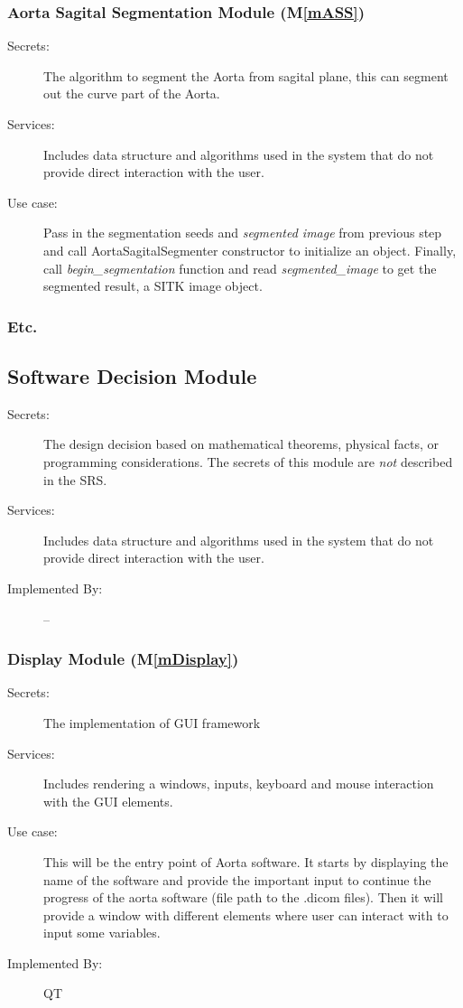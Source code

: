 \documentclass[12pt, titlepage]{article}
\newcommand{\mref}[1]{M\ref{#1}}
\begin{document}
\subsubsection{Aorta Sagital Segmentation Module (\mref{mASS})}
\begin{description}
\item[Secrets:] The algorithm to segment the Aorta from sagital plane, this can segment out the curve part of the Aorta.
\item[Services:] Includes data structure and algorithms used in the system that
  do not provide direct interaction with the user. 
\item[Use case:] Pass in the segmentation seeds and \emph{segmented image} from previous step and call AortaSagitalSegmenter constructor to initialize an object. 
Finally, call \emph{begin\_segmentation} function and read \emph{segmented\_image}
to get the segmented result, a SITK image object.
\end{description}


\subsubsection{Etc.}


\subsection{Software Decision Module}

\begin{description}
\item[Secrets:] The design decision based on mathematical theorems, physical
  facts, or programming considerations. The secrets of this module are
  \emph{not} described in the SRS.
\item[Services:] Includes data structure and algorithms used in the system that
  do not provide direct interaction with the user. 
\item[Implemented By:] --
\end{description}

\subsubsection{Display Module (\mref{mDisplay})}
\begin{description}
\item[Secrets:] The implementation of GUI framework
\item[Services:] Includes rendering a windows, inputs, keyboard and mouse interaction with the GUI elements.
\item[Use case:] This will be the entry point of Aorta software. It starts by displaying the name of the software and provide the important input to continue the progress of the aorta software (file path to the .dicom files). Then it will provide a window with different elements where user can interact with to input some variables. 
\item[Implemented By:] QT
\end{description}
\end{document}

